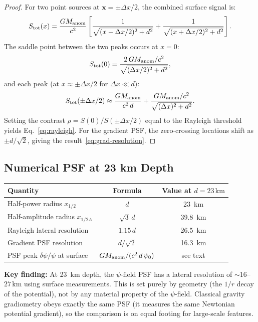 \documentclass[aps,prd,twocolumn,superscriptaddress,nofootinbib]{revtex4-2}
\newcommand{\km}{\,\mathrm{km}}
\begin{document}
\begin{proof}
For two point sources at $\mathbf{x} = \pm\Delta x/2$, the combined
surface signal is:
\begin{equation}
  S_{\rm tot}(x) = \frac{GM_{\rm anom}}{c^2}
  \left[\frac{1}{\sqrt{(x - \Delta x/2)^2 + d^2}}
  + \frac{1}{\sqrt{(x + \Delta x/2)^2 + d^2}}\right].
\end{equation}
The saddle point between the two peaks occurs at $x = 0$:
\begin{equation}
  S_{\rm tot}(0) = \frac{2\,G M_{\rm anom}/c^2}{\sqrt{(\Delta x/2)^2 + d^2}},
\end{equation}
and each peak (at $x \approx \pm\Delta x/2$ for $\Delta x \ll d$):
\begin{equation}
  S_{\rm tot}(\pm\Delta x/2) \approx \frac{G M_{\rm anom}}{c^2\,d}
  + \frac{G M_{\rm anom}/c^2}{\sqrt{(\Delta x)^2 + d^2}}.
\end{equation}
Setting the contrast $\rho = S(0)/S(\pm\Delta x/2)$ equal to the
Rayleigh threshold yields Eq.~\eqref{eq:rayleigh}.  For the gradient
PSF, the zero-crossing locations shift as $\pm d/\sqrt{2}$, giving
the result~\eqref{eq:grad-resolution}.
\end{proof}

\subsection{Numerical PSF at 23 km Depth}

\begin{center}
\begin{tabular}{lcc}
\toprule
Quantity & Formula & Value at $d = 23\km$ \\
\midrule
Half-power radius $x_{1/2}$ & $d$ & 23~km \\
Half-amplitude radius $x_{1/2A}$ & $\sqrt{3}\,d$ & 39.8~km \\
Rayleigh lateral resolution & $1.15\,d$ & 26.5~km \\
Gradient PSF resolution & $d/\sqrt{2}$ & 16.3~km \\
PSF peak $\delta\psi/\psi$ at surface & $GM_{\rm anom}/(c^2\,d\,\psi_0)$ & see text \\
\bottomrule
\end{tabular}
\end{center}

\textbf{Key finding:} At 23~km depth, the $\psi$-field PSF has a lateral
resolution of $\sim 16$--$27\km$ using surface measurements.  This is
set purely by geometry (the $1/r$ decay of the potential), not by any
material property of the $\psi$-field.  Classical gravity gradiometry
obeys exactly the same PSF (it measures the same Newtonian potential
gradient), so the comparison is on equal footing for large-scale features.
\end{document}
